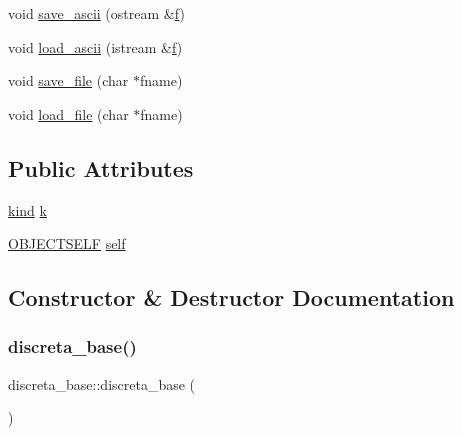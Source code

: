 \begin{DoxyCompactItemize}
\item 
void \mbox{\hyperlink{classdiscreta__base_a20b88cb86e90c53a6046843396c171b1}{save\+\_\+ascii}} (ostream \&\mbox{\hyperlink{alphabet2_8_c_a362077c979b0bb65159c603270e40f70}{f}})
\item 
void \mbox{\hyperlink{classdiscreta__base_a48d7769e2b58ee14dca23bff7bb24fc4}{load\+\_\+ascii}} (istream \&\mbox{\hyperlink{alphabet2_8_c_a362077c979b0bb65159c603270e40f70}{f}})
\item 
void \mbox{\hyperlink{classdiscreta__base_a17630e7267e0a73778a3b544f4ebdd11}{save\+\_\+file}} (char $\ast$fname)
\item 
void \mbox{\hyperlink{classdiscreta__base_a73a86b4ef5ef9305667b05003ea1b32e}{load\+\_\+file}} (char $\ast$fname)
\end{DoxyCompactItemize}
\subsection*{Public Attributes}
\begin{DoxyCompactItemize}
\item 
\mbox{\hyperlink{discreta_8h_aaf25ee7e2306d78c74ec7bc48f092e81}{kind}} \mbox{\hyperlink{classdiscreta__base_a6f7a0f7bdd115b9e4dde358cfa7ebf81}{k}}
\item 
\mbox{\hyperlink{union_o_b_j_e_c_t_s_e_l_f}{O\+B\+J\+E\+C\+T\+S\+E\+LF}} \mbox{\hyperlink{classdiscreta__base_a46d2effc12a280b39ac6b2f940a3abf0}{self}}
\end{DoxyCompactItemize}


\subsection{Constructor \& Destructor Documentation}
\mbox{\label{classdiscreta__base_a52f72e02c11c566c8a8389b662b6c50c}} 
\subsubsection{\texorpdfstring{discreta\+\_\+base()}{discreta\_base()}\hspace{0.1cm}{\footnotesize\ttfamily [1/2]}}
{\footnotesize\ttfamily discreta\+\_\+base\+::discreta\+\_\+base (\begin{DoxyParamCaption}{ }\end{DoxyParamCaption})}


